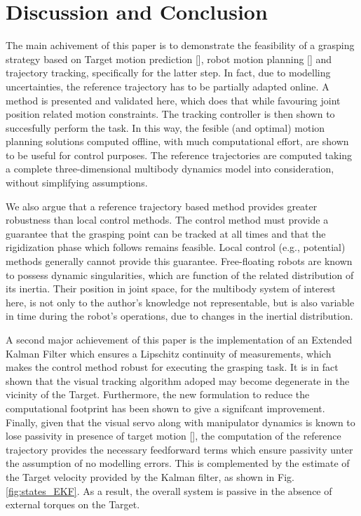 \section{Discussion and Conclusion}
%
The main achivement of this paper is to demonstrate the feasibility of a grasping strategy based on Target motion prediction [], robot motion planning [] and trajectory tracking, specifically for the latter step. In fact, due to modelling uncertainties, the reference trajectory has to be partially adapted online. A method is presented and validated here, which does that while favouring joint position related motion constraints. The tracking controller is then shown to succesfully perform the task. In this way, the fesible (and optimal) motion planning solutions computed offline, with much computational effort, are shown to be useful for control purposes. The reference trajectories are computed taking a complete three-dimensional multibody dynamics model into consideration, without simplifying assumptions.

We also argue that a reference trajectory based method provides greater robustness than local control methods. The control method must provide a guarantee that the grasping point can be tracked at all times and that the rigidization phase which follows remains feasible. Local control (e.g., potential) methods generally cannot provide this guarantee. Free-floating robots are known to possess dynamic singularities, which are function of the related distribution of its inertia. Their position in joint space, for the multibody system of interest here, is not only to the author's knowledge not representable, but is also variable in time during the robot's operations, due to changes in the inertial distribution. 

A second major achievement of this paper is the implementation of an Extended Kalman Filter which ensures a Lipschitz continuity of measurements, which makes the control method robust for executing the grasping task. It is in fact shown that the visual tracking algorithm adoped may become degenerate in the vicinity of the Target. Furthermore, the new formulation to reduce the computational footprint has been shown to give a signifcant improvement. Finally, given that the visual servo along with manipulator dynamics is known to lose passivity in presence of target motion [], the computation of the reference trajectory provides the necessary feedforward terms which ensure passivity unter the assumption of no modelling errors. This is complemented by the estimate of the Target velocity provided by the Kalman filter, as shown in Fig.\ref{fig:states_EKF}. As a result, the overall system is passive in the absence of external torques on the Target.

